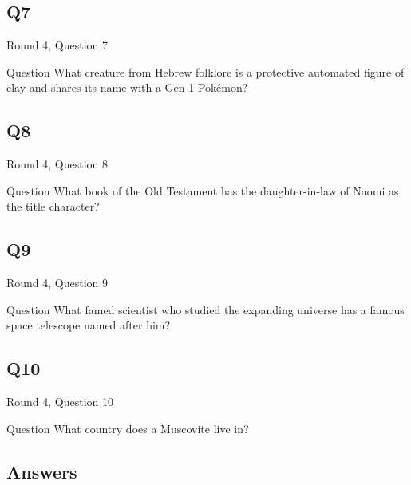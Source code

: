 \documentclass[11pt]{beamer}
\begin{document}
\subsection*{Q7}
\begin{frame}[t]{Round 4, Question 7}
\vspace{2em}
\begin{block}{Question}
What creature from Hebrew folklore is a protective automated figure of clay and shares its name with a Gen 1 Pokémon\@?
\end{block}
\end{frame}
    

\subsection*{Q8}
\begin{frame}[t]{Round 4, Question 8}
\vspace{2em}
\begin{block}{Question}
What book of the Old Testament has the daughter-in-law of Naomi as the title character\@?
\end{block}
\end{frame}
    

\subsection*{Q9}
\begin{frame}[t]{Round 4, Question 9}
\vspace{2em}
\begin{block}{Question}
What famed scientist who studied the expanding universe has a famous space telescope named after him\@?
\end{block}
\end{frame}
    

\subsection*{Q10}
\begin{frame}[t]{Round 4, Question 10}
\vspace{2em}
\begin{block}{Question}
What country does a Muscovite live in\@?
\end{block}
\end{frame}
    
\subsection{Answers}
\end{document}
